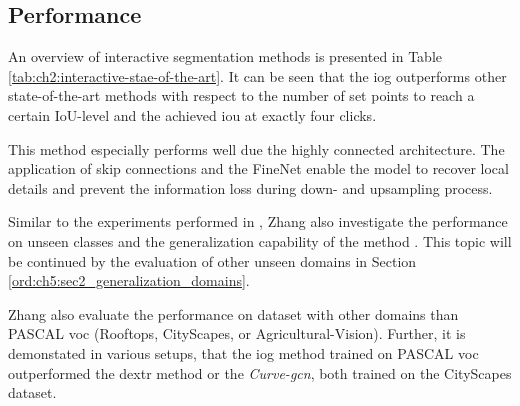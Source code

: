 \subsection{Performance}\label{ord:ch3:sec4:subsec5}

An overview of interactive segmentation methods is presented in Table \ref{tab:ch2:interactive-stae-of-the-art}.
It can be seen that the \gls{iog} outperforms other state-of-the-art methods with respect to the number of set points to reach a certain IoU-level and the achieved \gls{iou} at exactly four clicks.

This method especially performs well due the highly connected architecture.
The application of skip connections and the FineNet enable the model to recover local details and prevent the information loss during down- and upsampling process.

Similar to the experiments performed in \cite{Man18-DEXTR}, Zhang \etal also investigate the performance on unseen classes and the generalization capability of the method \Cite{Zha20-IOG}. 
This topic will be continued by the evaluation of other unseen domains in Section \ref{ord:ch5:sec2_generalization_domains}.

Zhang \etal also evaluate the performance on dataset with other domains than PASCAL \gls{voc} (\eg Rooftops, CityScapes, or Agricultural-Vision).
Further, it is demonstated in various setups, that the \gls{iog} method trained on PASCAL \gls{voc} outperformed the \gls{dextr} method or the \textit{Curve-\gls{gcn}}, both trained on the CityScapes dataset.

